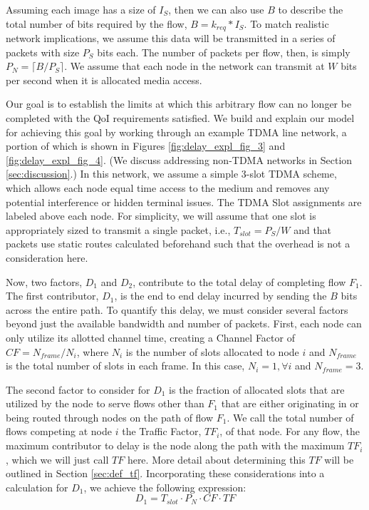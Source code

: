 Assuming each image has a size of $I_S$, then we can also use $B$ to describe the total number of bits required by the flow, $B=k_{req}*I_S$.  To match realistic network implications, we assume this data will be transmitted in a series of packets with size $P_S$ bits each.  The number of packets per flow, then, is simply $P_N = \lceil B/P_S \rceil$.  We assume that each node in the network can transmit at $W$ bits per second when it is allocated media access.

Our goal is to establish the limits at which this arbitrary flow can no longer be completed with the QoI requirements satisfied.  We build and explain our model for achieving this goal by working through an example TDMA line network, a portion of which is shown in Figures \ref{fig:delay_expl_fig_3} and \ref{fig:delay_expl_fig_4}.  (We discuss addressing non-TDMA networks in Section \ref{sec:discussion}.)  In this network, we assume a simple 3-slot TDMA scheme, which allows each node equal time access to the medium and removes any potential interference or hidden terminal issues.  The TDMA Slot assignments are labeled above each node.  For simplicity, we will assume that one slot is appropriately sized to transmit a single packet, i.e., $T_{slot} = P_S/W$ and that packets use static routes calculated beforehand such that the overhead is not a consideration here.

Now, two factors, $D_1$ and $D_2$, contribute to the total delay of completing flow $F_1$.  The first contributor, $D_1$, is the end to end delay incurred by sending the $B$ bits across the entire path.  To quantify this delay, we must consider several factors beyond just the available bandwidth and number of packets.  First, each node can only utilize its allotted channel time, creating a Channel Factor of $CF = N_{frame}/N_{i}$, where $N_{i}$ is the number of slots allocated to node $i$ and $N_{frame}$ is the total number of slots in each frame.  In this case, $N_{i} = 1, \forall i$ and $N_{frame} = 3$.  

The second factor to consider for $D_1$ is the fraction of allocated slots that are utilized by the node to serve flows other than $F_1$ that are either originating in or being routed through nodes on the path of flow $F_1$.  We call the total number of flows competing at node $i$ the Traffic Factor, $TF_i$, of that node.  For any flow, the maximum contributor to delay is the node along the path with the maximum $TF_i$, which we will just call $TF$ here.  More detail about determining this $TF$ will be outlined in Section \ref{sec:def_tf}.  Incorporating these considerations into a calculation for $D_1$, we achieve the following expression:  %
\begin{equation}
	D_1 = T_{slot} \cdot P_N \cdot CF \cdot TF
\end{equation}

